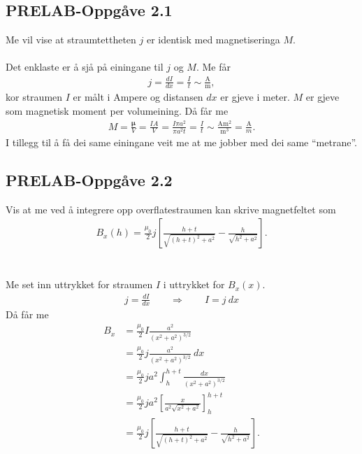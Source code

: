 \documentclass[11pt, a4paper]{article}
\theoremstyle{definition}
\newcommand{\vb}{\mathbf}
\begin{document}
  \subsection*{PRELAB-Oppgåve 2.1}
    Me vil vise at straumtettheten $j$ er identisk med magnetiseringa $M$. \\ \\
    Det enklaste er å sjå på einingane til $j$ og $M$. Me får
    \begin{align*}
      j = \frac{dI}{dx} = \frac{I}{t} \sim \frac{\text{A}}{\text{m}},
    \end{align*}
    kor straumen $I$ er målt i Ampere og distansen $dx$ er gjeve i meter. $M$ er gjeve som magnetisk moment per volumeining. Då får me
    \begin{align*}
      M = \frac{\vb{\mu}}{V} = \frac{IA}{V} = \frac{I\pi a^2}{\pi a^2t} = \frac{I}{t} \sim \frac{\text{A}\text{m}^2}{\text{m}^3} = \frac{\text{A}}{{m}}.
    \end{align*}
    I tillegg til å få dei same einingane veit me at me jobber med dei same ``metrane''.

  \subsection*{PRELAB-Oppgåve 2.2}
    Vis at me ved å integrere opp overflatestraumen kan skrive magnetfeltet som
    \begin{align*}
      B_x(h) = \frac{\mu_0}{2}j\left[ \frac{h + t}{\sqrt{(h + t)^2 + a^2}} - \frac{h}{\sqrt{h^2 + a^2}} \right].
    \end{align*} \\ \\
    Me set inn uttrykket for straumen $I$ i uttrykket for $B_x(x)$.
    \begin{align*}
      j = \frac{dI}{dx} \qquad \Rightarrow \qquad I = j\ dx
    \end{align*}
    Då får me 
    \begin{align*}
      B_x &= \frac{\mu_0}{2}I \frac{a^2}{(x^2 + a^2)^{3/2}} \\
      &= \frac{\mu_0}{2}j\frac{a^2}{(x^2 + a^2)^{3/2}}\ dx \\
      &= \frac{\mu_0}{2}ja^2\int_h^{h + t}\frac{dx}{(x^2 + a^2)^{3/2}} \\
      &= \frac{\mu_0}{2}ja^2\left[ \frac{x}{a^2\sqrt{x^2 + a^2}} \right]_h^{h + t} \\
      &= \frac{\mu_0}{2}j\left[ \frac{h + t}{\sqrt{(h + t)^2 + a^2}} - \frac{h}{\sqrt{h^2 + a^2}} \right].
    \end{align*}
\end{document}
